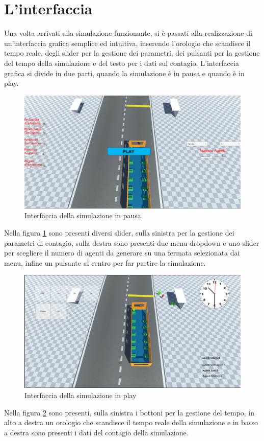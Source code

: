 \documentclass[12pt, openany]{book}
\begin{document}
 	\section{L'interfaccia}
 	Una volta arrivati alla simulazione funzionante, si è passati alla realizzazione di un'interfaccia grafica semplice ed intuitiva, inserendo l'orologio che scandisce il tempo reale, degli slider per la gestione dei parametri, dei pulsanti per la gestione del tempo della simulazione e del testo per i dati sul contagio. L'interfaccia grafica si divide in due parti, quando la simulazione è in pausa e quando è in play.
 	\begin{figure}[H]
 		\centering
 		\includegraphics[width=0.8\linewidth]{"Immagini/PausedGui.png"}
 		\caption{Interfaccia della simulazione in pausa}
 		\label{fig:InterfacciaPausa}
 	\end{figure}
 	Nella figura \ref{fig:InterfacciaPausa} sono presenti diversi slider, sulla sinistra per la gestione dei parametri di contagio, sulla destra sono presenti due menu dropdown e uno slider per scegliere il numero di agenti da generare su una fermata selezionata dai menu, infine un pulsante al centro per far partire la simulazione.
 
 	\begin{figure}[H]
 		\centering
 		\includegraphics[width=0.8\linewidth]{"Immagini/PlayGui.png"}
 		\caption{Interfaccia della simulazione in play}
 		\label{fig:InterfacciaPlay}
 	\end{figure}
 	Nella figura \ref{fig:InterfacciaPlay} sono presenti, sulla sinistra i bottoni per la gestione del tempo, in alto a destra un orologio che scandisce il tempo reale della simulazione e in basso a destra sono presenti i dati del contagio della simulazione.
\end{document}
